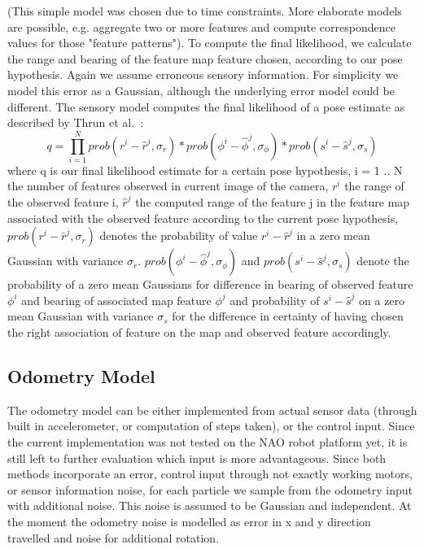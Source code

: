 \documentclass[	DIV=calc,%
							paper=a4,%
							fontsize=9pt,%
							twocolumn]{scrartcl}	 					%
\begin{document}
(This simple model was chosen due to time constraints. More elaborate models are possible, e.g. aggregate two or more features and compute correspondence values for those "feature patterns"). To compute the final likelihood, we calculate the range and bearing of the feature map feature chosen, according to our pose hypothesis. Again we assume erroneous sensory information. For simplicity we model this error as a Gaussian, although the underlying error model could be different. 
The sensory model computes the final likelihood of a pose estimate as described by Thrun et al.~\cite{ProbabilisticRobotics}:
\[ q = \prod\limits_{i=1}^{N}{ prob(r^i  - \hat{r}^j,\sigma_r) * prob(\phi^i - \hat{\phi}^j ,\sigma_{\phi}) * prob(s^i - \hat{s}^j ,\sigma_s)  }  \]
where q is our final likelihood estimate for a certain pose hypothesis, i = 1 .. N the number of features observed in current image of the camera, $ r^i $ the range of the observed feature i, $\hat{r}^j$ the computed range of the feature j in the feature map associated with the observed feature according to the current pose hypothesis, $prob(r^i - \hat{r}^j,\sigma_r)$ denotes the probability of value $r^i - \hat{r}^j$ in a zero mean Gaussian with variance $\sigma_r$. $prob(\phi^i - \hat{\phi}^j ,\sigma_{\phi})$ and  $prob(s^i - \hat{s}^j ,\sigma_s)$ denote the probability of a zero mean Gaussians for difference in bearing of observed feature $\phi^i$ and bearing of associated map feature $\phi^j$ and probability of $s^i - \hat{s}^j$ on a zero mean Gaussian with variance $\sigma_s$ for the difference in certainty of having chosen the right association of feature on the map and observed feature accordingly.


\subsection{Odometry Model}
\label{sec:Odometry}
The odometry model can be either implemented from actual sensor data (through built in accelerometer, or computation of steps taken), or the control input. Since the current implementation was not tested on the NAO robot platform yet, it is still left to further evaluation which input is more advantageous. 
Since both methods incorporate an error, control input through not exactly working motors, or sensor information noise, for each particle we sample from the odometry input with additional noise.
This noise is assumed to be Gaussian and independent. At the moment the odometry noise is modelled as error in x and y direction travelled and noise for additional rotation.
\end{document}
